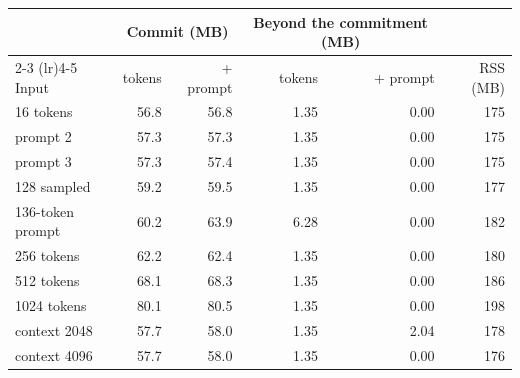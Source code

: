 \begin{tabular}{lrrrrr}
\toprule
 & \multicolumn{2}{c}{Commit (MB)} & \multicolumn{2}{c}{Beyond the commitment (MB)} & \\
\cmidrule(lr){2-3} \cmidrule(lr){4-5}
Input & tokens & + prompt & tokens & + prompt & RSS (MB) \\
\midrule
16 tokens & 56.8 & 56.8 & 1.35 & 0.00 & 175 \\
prompt 2 & 57.3 & 57.3 & 1.35 & 0.00 & 175 \\
prompt 3 & 57.3 & 57.4 & 1.35 & 0.00 & 175 \\
128 sampled & 59.2 & 59.5 & 1.35 & 0.00 & 177 \\
136-token prompt & 60.2 & 63.9 & 6.28 & 0.00 & 182 \\
256 tokens & 62.2 & 62.4 & 1.35 & 0.00 & 180 \\
512 tokens & 68.1 & 68.3 & 1.35 & 0.00 & 186 \\
1024 tokens & 80.1 & 80.5 & 1.35 & 0.00 & 198 \\
context 2048 & 57.7 & 58.0 & 1.35 & 2.04 & 178 \\
context 4096 & 57.7 & 58.0 & 1.35 & 0.00 & 176 \\
\bottomrule
\end{tabular}
